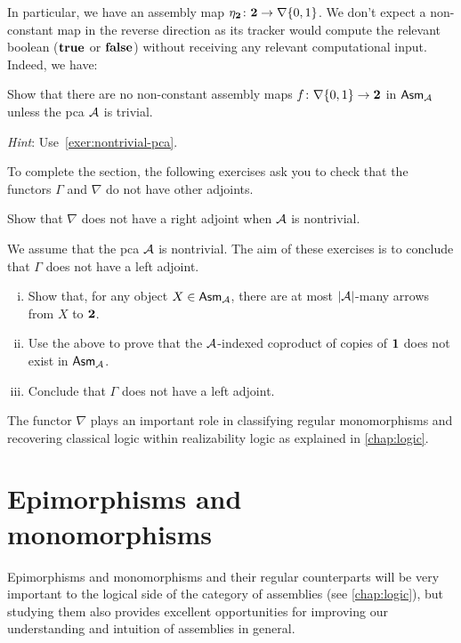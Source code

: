In particular, we have an assembly map
\(\eta_\Two \colon \Two \to \nabla\set{0,1}\).
%
We don't expect a non-constant map in the reverse direction as its tracker would
compute the relevant boolean (\(\pcatrue\) or \(\pcafalse\)) without receiving
any relevant computational input. Indeed, we have:

\begin{exercise}\label{exer:no-nabla-to-Two}
  Show that there are no non-constant assembly maps
  \(f \colon \nabla\set{0,1} \to \Two\) in \(\Asm{\AA}\) unless the pca \(\AA\)
  is trivial.

  \emph{Hint}: Use~\cref{exer:nontrivial-pca}.
\end{exercise}

To complete the section, the following exercises ask you to check that the
functors \(\Gamma\) and \(\nabla\) do not have other adjoints.

\begin{exercise}\label{exer:nabla-no-right-adjoint}
  Show that \(\nabla\) does not have a right adjoint when \(\AA\) is nontrivial.

\end{exercise}

\begin{exercise}\label{exer:Gamma-no-left-adjoint}
  We assume that the pca \(\AA\) is nontrivial. The aim of these exercises is to
  conclude that \(\Gamma\) does not have a left adjoint.
  \begin{enumerate}[(i)]
  \item Show that, for any object \(X \in \Asm{\AA}\), there are at most
    \(\carrier{\AA}\)-many arrows from \(X\) to \(\Two\).
  \item Use the above to prove that the \(\AA\)-indexed coproduct of copies of
    \(\One\) does not exist in \(\Asm{\AA}\).
  \item Conclude that \(\Gamma\) does not have a left adjoint.
  \end{enumerate}
\end{exercise}

The functor \(\nabla\) plays an important role in classifying regular
monomorphisms and recovering classical logic within realizability logic as
explained in \cref{chap:logic}.

\section{Epimorphisms and monomorphisms}
Epimorphisms and monomorphisms and their regular counterparts will be very
important to the logical side of the category of assemblies (see
\cref{chap:logic}), but studying them also provides excellent opportunities
for improving our understanding and intuition of assemblies in general.

